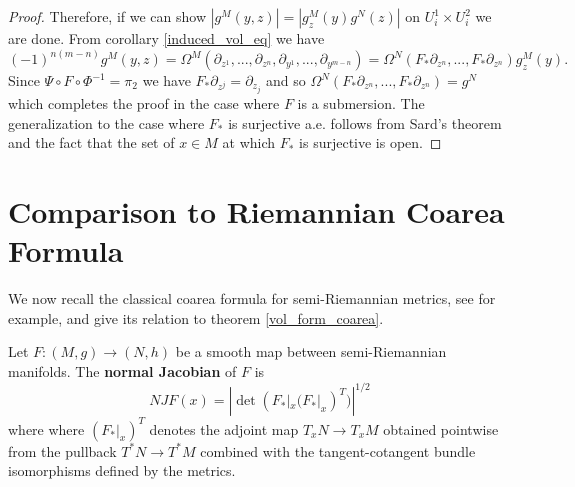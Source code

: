 \begin{proof}
Therefore, if we can show $|g^M(y,z)|=|g_z^M(y)g^N(z)|$ on $U_i^1\times U_i^2$ we are done. From corollary \ref{induced_vol_eq} we have
\begin{equation}
(-1)^{n(m-n)} g^M(y,z)=\Omega^M(\partial_{z^1},...,\partial_{z^n},\partial_{y^1},...,\partial_{y^{m-n}})=\Omega^N(F_*\partial_{z^n},...,F_*\partial_{z^n})g_z^M(y).
\end{equation}
Since $\Psi\circ F\circ\Phi^{-1}=\pi_2$ we have $F_*\partial_{z^j}=\partial_{z_j}$ and so $\Omega^N(F_*\partial_{z^n},...,F_*\partial_{z^n})=g^N$ which completes the proof in the case where $F$ is a submersion.  The generalization to the case where $F_*$ is surjective a.e. follows from Sard's theorem and the fact that the set of $x\in M$ at which $F_*$ is surjective is open.

\begin{comment}
The set K of $x\in M$ where $F_*$ is surjective is open in M by the rank theorem and by assumption, its complement has M-measure zero.  Therefore the lhs equal int_K f dOmega^M. F is a submersion on $K$ so   int_K f dOmega^M=int_N int_F|K^{-1}(z) f omega^M_z Omega^N.  Split this into an integral over regular values of $F:M->N$ and crit values.  The int over crit values is zero by Sard.  For z a regular value, F|_K^{-1}(z)=F^{-1}(z) Hence the lhs is int_N_ref int_F^{-1}(z) f omega^M_z Omega^N. 

  Split the rhs into integral over critical  values of F:M->N and regular values.  The integral over crit values is
 zero by sard, hence the rhs is
int_N_reg int F^{-1}(z).  Therefore they are equal.  QED
\end{comment}
\end{proof}
\section{Comparison to Riemannian Coarea Formula}
We now recall the classical coarea formula for semi-Riemannian metrics, see \cite{chavel1995riemannian} for example,  and give its relation to theorem \ref{vol_form_coarea}.
\begin{definition}
Let $F:(M,g)\rightarrow (N,h)$ be a smooth map between semi-Riemannian manifolds.  The {\bf normal Jacobian} of $F$ is
\begin{equation}
NJF(x)=|\det(F_*|_x(F_*|_x)^T)|^{1/2}
\end{equation}
where where $(F_*|_x)^T$ denotes the adjoint map $T_xN\rightarrow T_xM$ obtained pointwise from the pullback $T^*N\rightarrow T^*M$ combined with the tangent-cotangent bundle isomorphisms defined by the metrics.
\end{definition}

